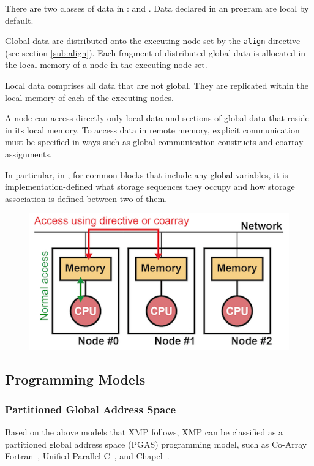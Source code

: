 There are two classes of data in {\XMP}: {\it {}} and
{\it {}}. Data declared in an {\XMP} program are local by
default.

Global data are distributed onto the executing node set by
the {\tt align} directive (see section \ref{sub:align}). Each fragment
of distributed global data is allocated in the local memory of a node in the
executing node set.

Local data comprises all data that are not global. They are replicated
within the local memory of each of the executing nodes.

A node can access directly only local data and sections of global data
that reside in its local memory.
%
To access data in remote memory, explicit communication must be
specified in ways such as global communication constructs and
coarray assignments.

In particular, in {\XMPF}, for common blocks that include any global
variables, it is implementation-defined what storage sequences they
occupy and how storage association is defined between two of them.

\begin{figure}
  \centering
  \includegraphics{figs/architecture.png}
\end{figure}


\subsection{Programming Models}

\subsubsection{Partitioned Global Address Space}

Based on the above models that XMP follows, XMP can be classified as a
partitioned global address space (PGAS) programming model, such as
Co-Array Fortran~\cite{caf}, Unified Parallel C~\cite{upc}, and
Chapel~\cite{chapel}.

